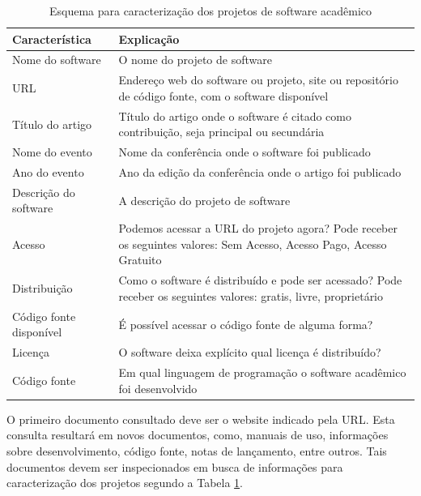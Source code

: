 \begin{table}[h]
\caption{Esquema para caracterização dos projetos de software acadêmico}
\centering
\begin{tabular}{ l p{11cm} }
  \hline
  Característica           & Explicação \\
  \hline
  Nome do software         & O nome do projeto de software \\
  URL                      & Endereço web do software ou projeto, site ou repositório de código fonte, com o software disponível \\
  Título do artigo         & Título do artigo onde o software é citado como contribuição, seja principal ou secundária \\
  Nome do evento           & Nome da conferência onde o software foi publicado \\
  Ano do evento            & Ano da edição da conferência onde o artigo foi publicado \\
  Descrição do software    & A descrição do projeto de software \\
  Acesso                   & Podemos acessar a URL do projeto agora? Pode receber os seguintes valores: Sem Acesso, Acesso Pago, Acesso Gratuito \\
  Distribuição             & Como o software é distribuído e pode ser acessado? Pode receber os seguintes valores: gratis, livre, proprietário \\
  Código fonte disponível  & É possível acessar o código fonte de alguma forma? \\
  Licença                  & O software deixa explícito qual licença é distribuído? \\
  Código fonte             & Em qual linguagem de programação o software acadêmico foi desenvolvido \\
  \hline
\end{tabular}
\label{esquema-caracteristicas}
\end{table}

O primeiro documento consultado deve ser o website indicado pela URL. Esta
consulta resultará em novos documentos, como, manuais de uso, informações sobre
desenvolvimento, código fonte, notas de lançamento, entre outros. 
Tais documentos devem ser inspecionados em busca de informações para
caracterização dos projetos segundo a Tabela \ref{esquema-caracteristicas}.

